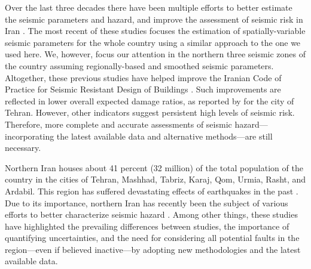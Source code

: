 Over the last three decades there have been multiple efforts to better estimate the seismic parameters and hazard, and improve the assessment of seismic risk in Iran \citep[e.g.,][]{Tavakoli1999, Moinfar_2000_Chap, Ghodrati2003, Moinfar_2012_WCEE, Khodaverdian_2016_BSSA}. The most recent of these studies \citep{Khodaverdian_2016_BSSA} focuses  the estimation of spatially-variable seismic parameters for the whole country using a similar approach to the one we used here. We, however, focus our attention in the northern three seismic zones of the country assuming regionally-based and smoothed seismic parameters. Altogether, these previous studies have helped improve the Iranian Code of Practice for Seismic Resistant Design of Buildings \citep{BHRC2014}. Such improvements are reflected in lower overall expected damage ratios, as reported by \citet{Ghodrati2013} for the city of Tehran. However, other indicators suggest persistent high levels of seismic risk. Therefore, more complete and accurate assessments of seismic hazard---incorporating the latest available data and alternative methods---are still necessary.

Northern Iran houses about 41 percent (32 million) of the total population of the country in the cities of Tehran, Mashhad, Tabriz, Karaj, Qom, Urmia, Rasht, and Ardabil. This region has suffered devastating effects of earthquakes in the past \citep[e.g.,][]{Mehrain_1990_Tech, Chafory-Ashtiany_1999_DPM, Razzaghi_2012_Tech}. Due to its importance, northern Iran has recently been the subject of various efforts to better characterize seismic hazard \citep[e.g.,][]{Abdollahzadeh2014a, Boostan2015}. Among other things, these studies have highlighted the prevailing differences between studies, the importance of quantifying uncertainties, and the need for considering all potential faults in the region---even if believed inactive---by adopting new methodologies and the latest available data.

